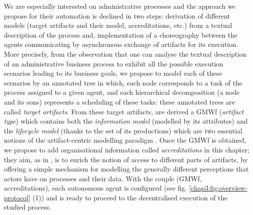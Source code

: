 We are especially interested on administrative processes and the approach we propose for their automation is declined in two steps: derivation of different models (target artifacts and their model, accreditations, etc.) from a textual description of the process and, implementation of a choreography between the agents communicating by asynchronous exchange of artifacts for its execution. More precisely, from the observation that one can analyse the textual description of an administrative business process to exhibit all the possible execution scenarios leading to its business goals, we propose to model each of these scenarios by an annotated tree in which, each node corresponds to a task of the process assigned to a given agent, and each hierarchical decomposition (a node and its sons) represents a scheduling of these tasks: these annotated trees are called \textit{target artifacts}. From these target artifacts, are derived a GMWf (\textit{artifact type}) which contains both the \textit{information model} (modelled by its attributes) and the \textit{lifecycle model} (thanks to the set of its productions) which are two essential notions of the artifact-centric modelling paradigm \cite{hull2013data}. Once the GMWf is obtained, we propose to add organisational information called \textit{accreditations} in this chapter; they aim, as in \cite{badouelTchoupeCmcs, theseTchoupe, tchoupeAtemkeng2, tchoupeZekeng2016, tchoupeZekeng2017, zekengTchoupe2018}, is to enrich the notion of access to different parts of artifacts, by offering a simple mechanism for modelling the generally different perceptions that actors have on processes and their data. With the couple (GMWf, accreditations), each autonomous agent is configured (see fig. \ref{chap3:fig:overview-protocol} (1)) and is ready to proceed to the decentralised execution of the studied process.


